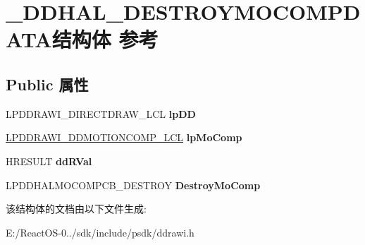 \hypertarget{struct___d_d_h_a_l___d_e_s_t_r_o_y_m_o_c_o_m_p_d_a_t_a}{}\section{\+\_\+\+D\+D\+H\+A\+L\+\_\+\+D\+E\+S\+T\+R\+O\+Y\+M\+O\+C\+O\+M\+P\+D\+A\+T\+A结构体 参考}
\label{struct___d_d_h_a_l___d_e_s_t_r_o_y_m_o_c_o_m_p_d_a_t_a}
\subsection*{Public 属性}
\begin{DoxyCompactItemize}
\item 
\mbox{\label{struct___d_d_h_a_l___d_e_s_t_r_o_y_m_o_c_o_m_p_d_a_t_a_a036e41f529a4af536186434e34a22384}} 
L\+P\+D\+D\+R\+A\+W\+I\+\_\+\+D\+I\+R\+E\+C\+T\+D\+R\+A\+W\+\_\+\+L\+CL {\bfseries lp\+DD}
\item 
\mbox{\label{struct___d_d_h_a_l___d_e_s_t_r_o_y_m_o_c_o_m_p_d_a_t_a_a4f56a79dfbd55c4296a441b5970484ef}} 
\hyperlink{struct___d_d_r_a_w_i___d_d_m_o_t_i_o_n_c_o_m_p___l_c_l}{L\+P\+D\+D\+R\+A\+W\+I\+\_\+\+D\+D\+M\+O\+T\+I\+O\+N\+C\+O\+M\+P\+\_\+\+L\+CL} {\bfseries lp\+Mo\+Comp}
\item 
\mbox{\label{struct___d_d_h_a_l___d_e_s_t_r_o_y_m_o_c_o_m_p_d_a_t_a_a33da9e8e55e5932b6c23c5f748346ff7}} 
H\+R\+E\+S\+U\+LT {\bfseries dd\+R\+Val}
\item 
\mbox{\label{struct___d_d_h_a_l___d_e_s_t_r_o_y_m_o_c_o_m_p_d_a_t_a_a9de83f0ef1e13e7dc9da113e8f20a2dc}} 
L\+P\+D\+D\+H\+A\+L\+M\+O\+C\+O\+M\+P\+C\+B\+\_\+\+D\+E\+S\+T\+R\+OY {\bfseries Destroy\+Mo\+Comp}
\end{DoxyCompactItemize}


该结构体的文档由以下文件生成\+:\begin{DoxyCompactItemize}
\item 
E\+:/\+React\+O\+S-\/0../sdk/include/psdk/ddrawi.\+h\end{DoxyCompactItemize}
